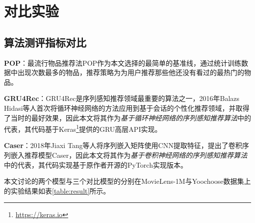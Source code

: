 
\section{对比实验}
\subsection{算法测评指标对比}
\textbf{POP}：最流行物品推荐法POP作为本文选择的最简单的基准线，通过统计训练数据中出现次数最多的物品，推荐策略为为用户推荐那些他还没有看过的最热门的物品。

\textbf{GRU4Rec}：GRU4Rec是序列感知推荐领域最重要的算法之一，2016年Balazs Hidasi等人首次将循环神经网络的方法应用到基于会话的个性化推荐领域，并取得了当时的最好效果，因此本文将其作为\textit{基于循环神经网络的序列感知推荐算法}中的代表，其代码基于Keras\footnote{\url{https://keras.io}}提供的GRU高层API实现。

\textbf{Caser}：2018年Jiaxi Tang等人将序列嵌入矩阵使用CNN提取特征，提出了卷积序列嵌入推荐模型Caser，因此本文将其作为\textit{基于卷积神经网络的序列感知推荐算法}中的代表，其代码实现基于原作者开源的PyTorch实现版本。

本文讨论的两个模型与三个对比模型的分别在MovieLens-1M与Yoochoose数据集上的实验结果如表\ref{table:result}所示。


